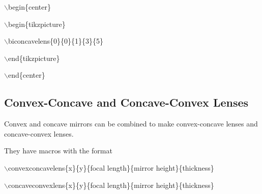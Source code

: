 \documentclass[12pt]{article}
\begin{document}
$\backslash$begin\{center\}

$\backslash$begin\{tikzpicture\}

$\backslash$biconcavelens\{0\}\{0\}\{1\}\{3\}\{5\}

$\backslash$end\{tikzpicture\}

$\backslash$end\{center\}

\subsection{Convex-Concave and Concave-Convex Lenses}

Convex and concave mirrors can be combined to make convex-concave lenses and concave-convex lenses.

They have macros with the format

$\backslash$convexconcavelens\{x\}\{y\}\{focal length\}\{mirror height\}\{thickness\}

$\backslash$concaveconvexlens\{x\}\{y\}\{focal length\}\{mirror height\}\{thickness\}
\end{document}

